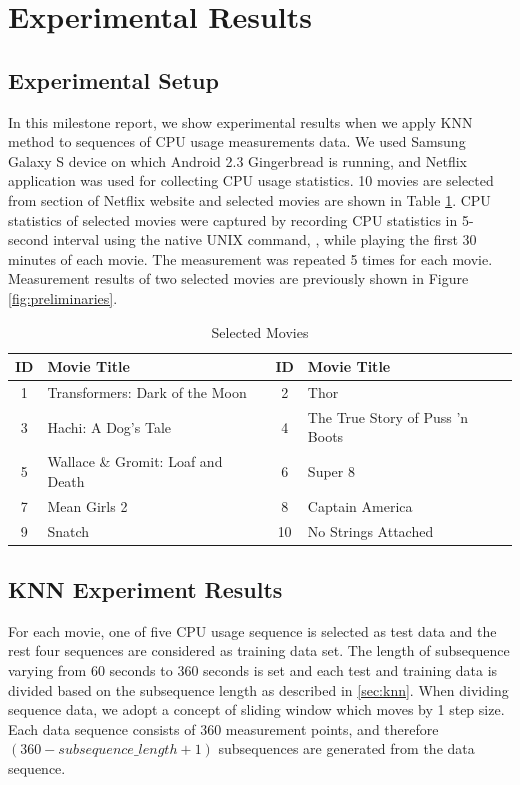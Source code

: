 \section{Experimental Results}
\label{sec:experiments}

\subsection{Experimental Setup}


In this milestone report, we show experimental results when we apply KNN method to sequences of CPU usage measurements data.
We used Samsung Galaxy S device on which Android 2.3 Gingerbread is running, and Netflix application was used for collecting CPU usage statistics.
10 movies are selected from  section of Netflix website and selected movies are shown in Table \ref{tab:movies}.
CPU statistics of selected movies were captured by recording CPU statistics in 5-second interval using the native UNIX command, , while playing the first 30 minutes of each movie. 
The measurement was repeated 5 times for each movie.
Measurement results of two selected movies are previously shown in Figure \ref{fig:preliminaries}.

\begin{table}[h!]
\begin{center}
\begin{tabular}{|c|l|c|l|}
\hline
ID & Movie Title & ID & Movie Title \\ 
\hline
1 & Transformers: Dark of the Moon 		& 2 & Thor \\
3 & Hachi: A Dog's Tale 			& 4 & The True Story of Puss 'n Boots \\
5 & Wallace \& Gromit: Loaf and Death 	& 6 & Super 8 \\
7 & Mean Girls 2 				& 8 & Captain America \\
9 & Snatch 					& 10 & No Strings Attached \\
\hline
\end{tabular}
\end{center}
\caption{Selected Movies}
\label{tab:movies}
\end{table}


\subsection{KNN Experiment Results}

For each movie, one of five CPU usage sequence is selected as test data and the rest four sequences are considered as training data set. 
The length of subsequence varying from 60 seconds to 360 seconds is set and each test and training data is divided based on the subsequence length as described in \ref{sec:knn}.
When dividing sequence data, we adopt a concept of sliding window which moves by 1 step size.
Each data sequence consists of $360$ measurement points, and therefore $(360 - subsequence\_length + 1)$ subsequences are generated from the data sequence. 

